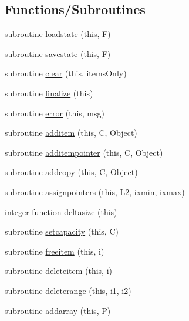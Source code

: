 \subsection*{Functions/\+Subroutines}
\begin{DoxyCompactItemize}
\item 
subroutine \mbox{\hyperlink{namespaceobjectlists_a48fc8838b5a4a323447fdd309cb70d4c}{loadstate}} (this, F)
\item 
subroutine \mbox{\hyperlink{namespaceobjectlists_a0524c4d9e51cce87cd2864352d116374}{savestate}} (this, F)
\item 
subroutine \mbox{\hyperlink{namespaceobjectlists_af7dd3c43a123562bc92cf38d6ed508cd}{clear}} (this, items\+Only)
\item 
subroutine \mbox{\hyperlink{namespaceobjectlists_ad1d73743c5898bdaac2a79a9ade2342c}{finalize}} (this)
\item 
subroutine \mbox{\hyperlink{namespaceobjectlists_a36abcb049579dcfaee4f3d38cf09b5d1}{error}} (this, msg)
\item 
subroutine \mbox{\hyperlink{namespaceobjectlists_a36d198e7276f781aed81d70840e2f9da}{additem}} (this, C, Object)
\item 
subroutine \mbox{\hyperlink{namespaceobjectlists_a20f8947e7e2c99268f61a292e215f144}{additempointer}} (this, C, Object)
\item 
subroutine \mbox{\hyperlink{namespaceobjectlists_a2487c78e7548dc0d57e860dc447fc9f2}{addcopy}} (this, C, Object)
\item 
subroutine \mbox{\hyperlink{namespaceobjectlists_a4fc2d0e75594a82db02035609ddab0d5}{assignpointers}} (this, L2, ixmin, ixmax)
\item 
integer function \mbox{\hyperlink{namespaceobjectlists_a302ff79b4cac76b93d93d5ab7ea9abc4}{deltasize}} (this)
\item 
subroutine \mbox{\hyperlink{namespaceobjectlists_a3f4c3dd9be50ae77b46cec13a3345fad}{setcapacity}} (this, C)
\item 
subroutine \mbox{\hyperlink{namespaceobjectlists_a180e000881c5eca28ea4c77daec5d47b}{freeitem}} (this, i)
\item 
subroutine \mbox{\hyperlink{namespaceobjectlists_a8110526567f8e6cf9fda3be8654005ad}{deleteitem}} (this, i)
\item 
subroutine \mbox{\hyperlink{namespaceobjectlists_ac82708b7b56f4fca7c7e55d43a84ad84}{deleterange}} (this, i1, i2)
\item 
subroutine \mbox{\hyperlink{namespaceobjectlists_aff0d8c1f6bf740fa33ba6c02cca08daf}{addarray}} (this, P)

\end{DoxyCompactItemize}
